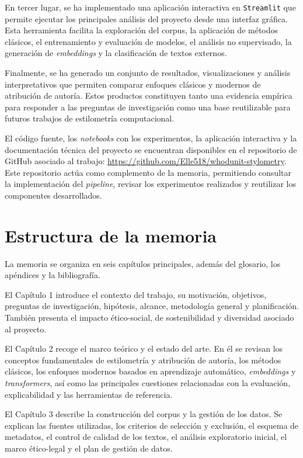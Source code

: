 \documentclass[IB]{TFUOC}%
\begin{document}
En tercer lugar, se ha implementado una aplicación interactiva en \texttt{Streamlit} que permite ejecutar los principales análisis del proyecto desde una interfaz gráfica. Esta herramienta facilita la exploración del corpus, la aplicación de métodos clásicos, el entrenamiento y evaluación de modelos, el análisis no supervisado, la generación de \textit{embeddings} y la clasificación de textos externos.

Finalmente, se ha generado un conjunto de resultados, visualizaciones y análisis interpretativos que permiten comparar enfoques clásicos y modernos de atribución de autoría. Estos productos constituyen tanto una evidencia empírica para responder a las preguntas de investigación como una base reutilizable para futuros trabajos de estilometría computacional.

El código fuente, los \textit{notebooks} con los experimentos, la aplicación interactiva y la documentación técnica del proyecto se encuentran disponibles en el repositorio de GitHub asociado al trabajo: \url{https://github.com/Elle518/whodunit-stylometry}. Este repositorio actúa como complemento de la memoria, permitiendo consultar la implementación del \textit{pipeline}, revisar los experimentos realizados y reutilizar los componentes desarrollados.

\section{Estructura de la memoria}

La memoria se organiza en seis capítulos principales, además del glosario, los apéndices y la bibliografía.

El Capítulo 1 introduce el contexto del trabajo, su motivación, objetivos, preguntas de investigación, hipótesis, alcance, metodología general y planificación. También presenta el impacto ético-social, de sostenibilidad y diversidad asociado al proyecto.

El Capítulo 2 recoge el marco teórico y el estado del arte. En él se revisan los conceptos fundamentales de estilometría y atribución de autoría, los métodos clásicos, los enfoques modernos basados en aprendizaje automático, \textit{embeddings} y \textit{transformers}, así como las principales cuestiones relacionadas con la evaluación, explicabilidad y las herramientas de referencia.

El Capítulo 3 describe la construcción del corpus y la gestión de los datos. Se explican las fuentes utilizadas, los criterios de selección y exclusión, el esquema de metadatos, el control de calidad de los textos, el análisis exploratorio inicial, el marco ético-legal y el plan de gestión de datos.
\end{document}
